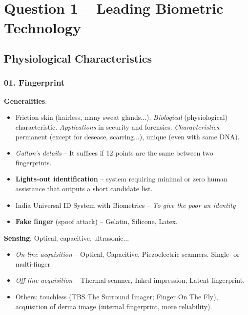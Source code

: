 \documentclass[a4paper]{article}
\title{\vspace{-.25cm} \HWTitle \\ \vspace{.25cm}}
\author{\HWAuthorName}
\begin{document}
\maketitle

\section*{Question 1 -- Leading Biometric Technology} %
\label{sec:question_1}

  \subsection*{Physiological Characteristics}
    \subsubsection*{01. Fingerprint}
      \textbf{Generalities}:
      \begin{itemize}
        \item Friction skin (hairless, many sweat glands...). \emph{Biological} (physiological) characteristic. \emph{Applications} in security and forensics. \emph{Characteristics}: permanent (except for desease, scarring...), unique (even with same DNA).
        \item \emph{Galton's details} -- It suffices if 12 points are the same between two fingerprints.
        \item \textbf{Lights-out identification} -- system requiring minimal or zero human assistance that outputs a short candidate list.
        \item India Universal ID System with Biometrics -- \emph{To give the poor an identity}
        \item \textbf{Fake finger} (spoof attack) -- Gelatin, Silicone, Latex.
      \end{itemize}

      \textbf{Sensing}: Optical, capacitive, ultrasonic...
      \begin{itemize}
        \item \emph{On-line acquisition} -- Optical, Capacitive, Piezoelectric scanners. Single- or multi-finger
        \item \emph{Off-line acquisition} -- Thermal scanner, Inked impression, Latent fingerprint.
        \item Others: touchless (TBS The Surround Imager; Finger On The Fly), acquisition of derma image (internal fingerprint, more reliability).
      \end{itemize}
\end{document}
